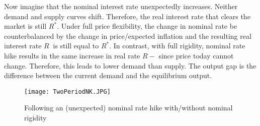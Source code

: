 \documentclass[]{article}
\begin{document}
Now imagine that the nominal interest rate unexpectedly increases. Neither demand and supply curves shift. Therefore, the real interest rate that clears the market is still $R^*$.  Under full price flexibility, the change in nominal rate be counterbalanced by the change in price/expected inflation and the resulting real interest rate $R~$ is still equal to $R^*$.  In contrast, with full rigidity, nominal rate hike results in the same increase in real rate $R-$ since price today cannot change.  Therefore, this leads to lower demand than supply. The output gap is the difference between the current demand and the equilibrium output.

\begin{figure}[ht]
	\centering
	\caption{Following an (unexpected) nominal rate hike with/without nominal rigidity}
		\label{period2}
	\texttt{[image: TwoPeriodNK.JPG]}
\end{figure}
\end{document}
